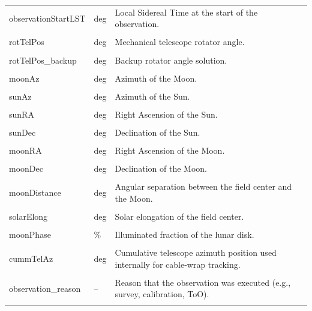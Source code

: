 \documentclass[english,10pt,a4paper]{article}
\begin{document}
\begin{longtable}{p{3.8cm}p{2cm}p{8.2cm}}
		observationStartLST & deg &
		Local Sidereal Time at the start of the observation. \\&&\\
		
		rotTelPos & deg &
		Mechanical telescope rotator angle. \\&&\\
		
		rotTelPos\_backup & deg &
		Backup rotator angle solution. \\&&\\
		
		moonAz & deg &
		Azimuth of the Moon. \\&&\\
		
		sunAz & deg &
		Azimuth of the Sun. \\&&\\
		
		sunRA & deg &
		Right Ascension of the Sun. \\&&\\
		
		sunDec & deg &
		Declination of the Sun. \\&&\\
		
		moonRA & deg &
		Right Ascension of the Moon. \\&&\\
		
		moonDec & deg &
		Declination of the Moon. \\&&\\
		
		moonDistance & deg &
		Angular separation between the field center and the Moon. \\&&\\
		
		solarElong & deg &
		Solar elongation of the field center. \\&&\\
		
		moonPhase & \% &
		Illuminated fraction of the lunar disk. \\&&\\
		
		cummTelAz & deg &
		Cumulative telescope azimuth position used internally for cable-wrap tracking. \\&&\\
		
		observation\_reason & -- &
		Reason that the observation was executed (e.g., survey, calibration, ToO). \\&&\\
		

\end{longtable}
\end{document}
